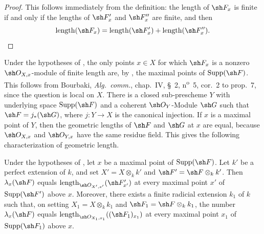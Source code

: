 \begin{proof}
This follows immediately from the definition: the length of
$\sh F_x$ is finite if and only if the lengths of $\sh F'_x$ and
$\sh F''_x$ are finite, and then
\[
\operatorname{length}(\sh F_x)
=\operatorname{length}(\sh F'_x)+
 \operatorname{length}(\sh F''_x).
\]
\end{proof}

\begin{env}[4.7.7]
\label{IV.4.7.7}
Under the hypotheses of , the only points $x\in X$ for
which $\sh F_x$ is a nonzero $\sh O_{X,x}$-module of finite length
are, by , the maximal points of
$\operatorname{Supp}(\sh F)$.
This follows from Bourbaki, \emph{Alg.\ comm.}, chap.~IV, \S~2,
n\textsuperscript{o}~5, cor.~2 to prop.~7, since the question is local
on $X$.
There is a closed sub-prescheme $Y$ with underlying space
$\operatorname{Supp}(\sh F)$ and a coherent $\sh O_Y$-Module $\sh G$
such that $\sh F=j_*(\sh G)$, where $j:Y\to X$ is the canonical
injection.
If $x$ is a maximal point of $Y$, then the geometric lengths of
$\sh F$ and $\sh G$ at $x$ are equal, because
$\sh O_{X,x}$ and $\sh O_{Y,x}$ have the same residue field.
This gives the following characterization of geometric length.
\end{env}

\begin{proposition}[4.7.8]
\label{IV.4.7.8}
Under the hypotheses of , let $x$ be a maximal point
of $\operatorname{Supp}(\sh F)$.
Let $k'$ be a perfect extension of $k$, and set
$X'=X\otimes_k k'$ and $\sh F'=\sh F\otimes_k k'$.
Then $\lambda_x(\sh F)$ equals
$\operatorname{length}_{\sh O_{X',x'}}(\sh F'_{x'})$ at every
maximal point $x'$ of $\operatorname{Supp}(\sh F')$ above $x$.
Moreover, there exists a finite radicial extension $k_1$ of $k$ such
that, on setting $X_1=X\otimes_k k_1$ and
$\sh F_1=\sh F\otimes_k k_1$, the number $\lambda_x(\sh F)$ equals
$\operatorname{length}_{\sh O_{X_1,x_1}}((\sh F_1)_{x_1})$ at every
maximal point $x_1$ of $\operatorname{Supp}(\sh F_1)$ above $x$.
\end{proposition}

